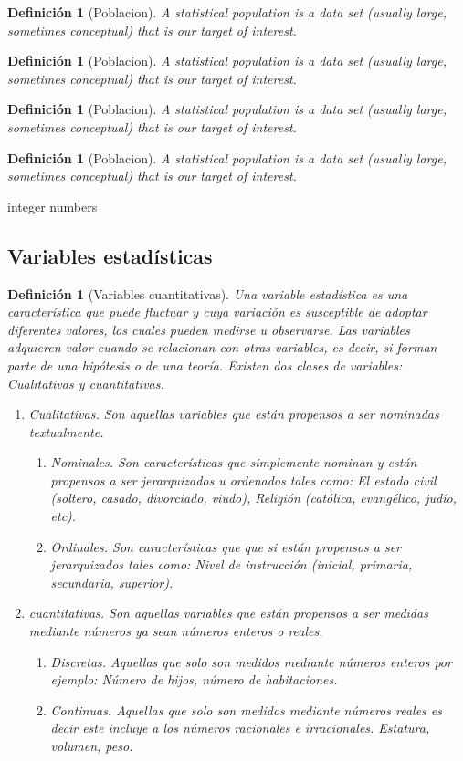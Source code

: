 \documentclass[a4paper]{report}
\newtheorem{defn}[thm]{Definición}
\begin{document}
\begin{defn}[Poblacion]
	A statistical population is a data set (usually large, sometimes conceptual) that is our target of interest.
\end{defn}
\begin{defn}[Poblacion]
	A statistical population is a data set (usually large, sometimes conceptual) that is our target of interest.
\end{defn}
\begin{defn}[Poblacion]
	A statistical population is a data set (usually large, sometimes conceptual) that is our target of interest.
\end{defn}
\begin{defn}[Poblacion]
	A statistical population is a data set (usually large, sometimes conceptual) that is our target of interest.
\end{defn}

integer numbers


\subsection{Variables estadísticas}

\begin{defn}[Variables cuantitativas]
	Una variable estadística es una característica que puede fluctuar y cuya variación es susceptible de adoptar diferentes valores, los cuales pueden medirse u observarse. Las variables adquieren valor cuando se relacionan con otras variables, es decir, si forman parte de una hipótesis o de una teoría. Existen dos clases de variables: Cualitativas y cuantitativas.
	\begin{enumerate}
		\item  Cualitativas. Son aquellas variables que están propensos a ser nominadas textualmente.
			\begin{enumerate}
				\item  Nominales. Son características que simplemente nominan y están propensos a ser jerarquizados u ordenados tales como: El estado   civil (soltero, casado, divorciado, viudo), Religión (católica, evangélico, judío, etc).
				\item  Ordinales. Son características que que si están propensos a ser jerarquizados tales como: Nivel de instrucción (inicial, primaria, secundaria, superior).
			\end{enumerate}
		\item  cuantitativas. Son aquellas variables que están propensos a ser medidas mediante números ya sean números enteros o reales.
			\begin{enumerate}
				\item  Discretas. Aquellas que solo son medidos mediante números enteros por ejemplo: Número de hijos, número de habitaciones.
				\item  Continuas. Aquellas que solo son medidos mediante números reales es decir este incluye a los números racionales e irracionales. Estatura, volumen, peso.
			\end{enumerate}
	\end{enumerate}
\end{defn}
\end{document}
